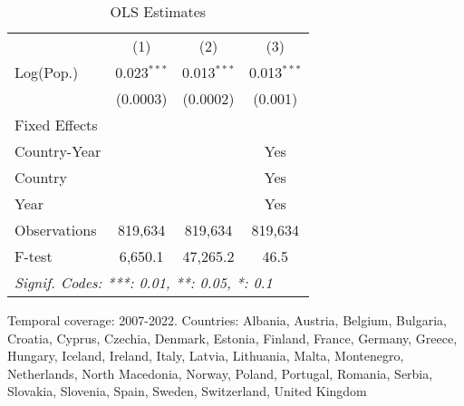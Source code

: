 
\begin{table}[htbp]
   \caption{\label{tab:ols1} OLS Estimates}
   \centering
   \small
   \begin{tabular}{lccc}
      \tabularnewline \midrule \midrule
                   & (1)           & (2)           & (3)\\  
      Log(Pop.)    & 0.023$^{***}$ & 0.013$^{***}$ & 0.013$^{***}$\\   
                   & (0.0003)      & (0.0002)      & (0.001)\\   
      Fixed Effects\\
      Country-Year &               &               & Yes\\  
      Country      &               &               & Yes\\  
      Year         &               &               & Yes\\  
      \midrule 
      Observations & 819,634       & 819,634       & 819,634\\  
      F-test       & 6,650.1       & 47,265.2      & 46.5\\  
      \midrule \midrule
      \multicolumn{4}{l}{\emph{Signif. Codes: ***: 0.01, **: 0.05, *: 0.1}}\\
   \end{tabular}
   
   \par \raggedright 
   Temporal coverage: 2007-2022. Countries: Albania, Austria, Belgium, Bulgaria, Croatia, Cyprus, Czechia, Denmark, Estonia, Finland, France, Germany, Greece, Hungary, Iceland, Ireland, Italy, Latvia, Lithuania, Malta, Montenegro, Netherlands, North Macedonia, Norway, Poland, Portugal, Romania, Serbia, Slovakia, Slovenia, Spain, Sweden, Switzerland, United Kingdom
\end{table}


